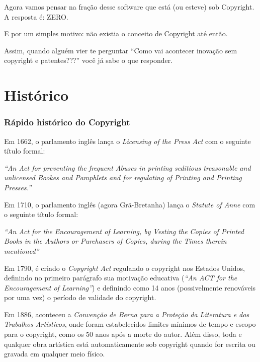 \documentclass[serif,mathserif]{beamer}
\begin{document}
\begin{frame}
  Agora vamos pensar na fração desse software que está (ou esteve) sob Copyright. \pause A resposta é: ZERO.\pause
  
  E por um simples motivo: não existia o conceito de Copyright até então. \pause
  
  \vspace{5mm} %
  Assim, quando alguém vier te perguntar ``Como vai acontecer inovação
  sem copyright e patentes???'' você já sabe o que responder.
\end{frame}
  
  
\section{Histórico}  %
  
\begin{frame}
  \frametitle{Rápido histórico do Copyright}
  Em 1662, o parlamento inglês lança o \emph{Licensing of the Press Act} com o seguinte título formal: \pause
  
  \textit{``An Act for preventing the frequent Abuses in printing seditious treasonable and unlicensed Bookes and Pamphlets and for regulating of Printing and Printing Presses.''}\pause
  
  \vspace{5mm} %
  Em 1710, o parlamento inglês (agora Grã-Bretanha) lança o \emph{Statute of Anne} com o seguinte título formal: \pause
  
  \textit{``An Act for the Encouragement of Learning, by Vesting the Copies of Printed Books in the Authors or Purchasers of Copies, during the Times therein mentioned''}
  
\end{frame}
  
\begin{frame}
  Em 1790, é criado o \emph{Copyright Act} regulando o copyright nos Estados Unidos, definindo no primeiro parágrafo sua motivação educativa (\textit{``An \emph{ACT} for the \emph{Encouragement} of \emph{Learning}''}) e definindo como 14 anos (possivelmente renováveis por uma vez) o período de validade do copyright.\pause
  
  \vspace{5mm} %
  Em 1886, aconteceu a \emph{Convenção de Berna para a Proteção da Literatura e dos Trabalhos Artísticos}, onde foram
  estabelecidos limites mínimos de tempo e escopo para o copyright, como os 50 anos após a morte do autor. Além disso,
  toda e qualquer obra artística está automaticamente sob copyright quando for escrita ou gravada em qualquer meio físico. 

\end{frame}
\end{document}
